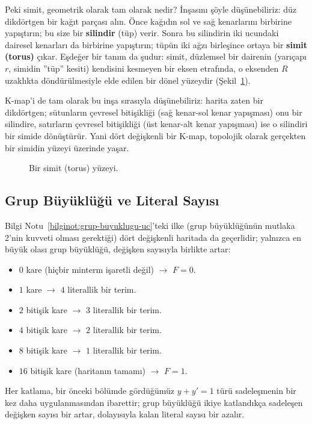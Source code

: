 Peki simit, geometrik olarak tam olarak nedir? İnşasını şöyle düşünebiliriz: düz dikdörtgen
bir kağıt parçası alın. Önce kağıdın sol ve sağ kenarlarını birbirine yapıştırın; bu size
bir \textbf{silindir} (tüp) verir. Sonra bu silindirin iki ucundaki dairesel kenarları da
birbirine yapıştırın; tüpün iki ağzı birleşince ortaya bir \textbf{simit (torus)} çıkar.
Eşdeğer bir tanım da şudur: simit, düzlemsel bir dairenin (yarıçapı $r$, simidin ''tüp''
kesiti) kendisini kesmeyen bir eksen etrafında, o eksenden $R$ uzaklıkta döndürülmesiyle elde
edilen bir dönel yüzeydir (Şekil~\ref{fig:torus-3d}).

K-map'i de tam olarak bu inşa sırasıyla düşünebiliriz: harita zaten bir dikdörtgen; sütunların
çevresel bitişikliği (sağ kenar-sol kenar yapışması) onu bir silindire, satırların çevresel
bitişikliği (üst kenar-alt kenar yapışması) ise o silindiri bir simide dönüştürür. Yani dört
değişkenli bir K-map, topolojik olarak gerçekten bir simidin yüzeyi üzerinde yaşar.

\begin{figure}[H]
\centering
{}
\caption{Bir simit (torus) yüzeyi.}
\label{fig:torus-3d}
\end{figure}

\subsection{Grup Büyüklüğü ve Literal Sayısı}\label{sec:kmap-dort-grup-buyuklugu}
Bilgi Notu~\ref{bilginot:grup-buyuklugu-uc}'teki ilke (grup büyüklüğünün mutlaka 2'nin kuvveti
olması gerektiği) dört değişkenli haritada da geçerlidir; yalnızca en büyük olası grup
büyüklüğü, değişken sayısıyla birlikte artar:
\begin{itemize}[nosep, leftmargin=*]
    \item $0$ kare (hiçbir minterm işaretli değil) $\to$ $F=0$.
    \item $1$ kare $\to$ $4$ literallik bir terim.
    \item $2$ bitişik kare $\to$ $3$ literallik bir terim.
    \item $4$ bitişik kare $\to$ $2$ literallik bir terim.
    \item $8$ bitişik kare $\to$ $1$ literallik bir terim.
    \item $16$ bitişik kare (haritanın tamamı) $\to$ $F=1$.
\end{itemize}
Her katlama, bir önceki bölümde gördüğümüz $y+y'=1$ türü sadeleşmenin bir kez daha
uygulanmasından ibarettir; grup büyüklüğü ikiye katlandıkça sadeleşen değişken sayısı bir
artar, dolayısıyla kalan literal sayısı bir azalır.

